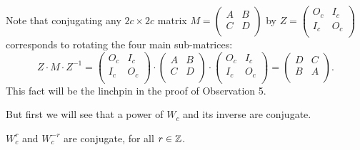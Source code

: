 Note that conjugating any $2c\times 2c$ matrix $M=
\left(\begin{smallmatrix} A & B \\ C & D \\\end{smallmatrix}\right)$ by
$Z=\left(\begin{smallmatrix} O_c & I_c \\ I_c & O_c \\\end{smallmatrix}\right)$ 
corresponds to rotating the four main sub-matrices:
\begin{equation}\label{eq:rotate}
Z\cdot M\cdot Z^{-1}=\left(\begin{matrix} O_c & I_c \\ I_c & O_c \\\end{matrix}\right)
\cdot
\left(\begin{matrix} A & B \\ C & D \\\end{matrix}\right)
\cdot
\left(\begin{matrix} O_c & I_c \\ I_c & O_c \\\end{matrix}\right)
=
\left(\begin{matrix} D & C \\ B & A \\\end{matrix}\right).\end{equation}
This fact will be the linchpin in the proof of Observation 5.

But first we will see that a power of $W_{c}$ and its inverse are conjugate.
\begin{lemma}
  $W_{c}^r$ and $W_{c}^{-r}$ are conjugate, for all $r\in\mathbb{Z}$.
\end{lemma}

